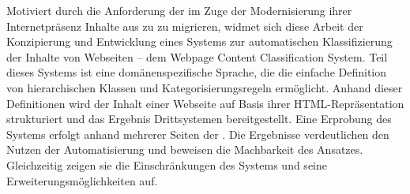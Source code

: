 Motiviert durch die Anforderung der {\fernUni} im Zuge der Modernisierung ihrer
Internetpräsenz Inhalte aus {\wordpress} zu {\imperia} zu migrieren,
widmet sich diese Arbeit der Konzipierung und Entwicklung eines Systems
zur automatischen Klassifizierung der Inhalte von Webseiten
-- dem Webpage Content Classification System.
Teil dieses Systems ist eine domänenspezifische Sprache, die die einfache
Definition von hierarchischen Klassen und Kategorisierungsregeln ermöglicht.
Anhand dieser Definitionen wird der Inhalt einer Webseite auf Basis ihrer
HTML-Repräsentation strukturiert und das Ergebnis Drittsystemen bereitgestellt.
Eine Erprobung des Systems erfolgt anhand mehrerer Seiten der {\fernUni}.
Die Ergebnisse verdeutlichen den Nutzen der Automatisierung und
beweisen die Machbarkeit des Ansatzes.
Gleichzeitig zeigen sie die Einschränkungen des Systems und seine Erweiterungsmöglichkeiten auf.